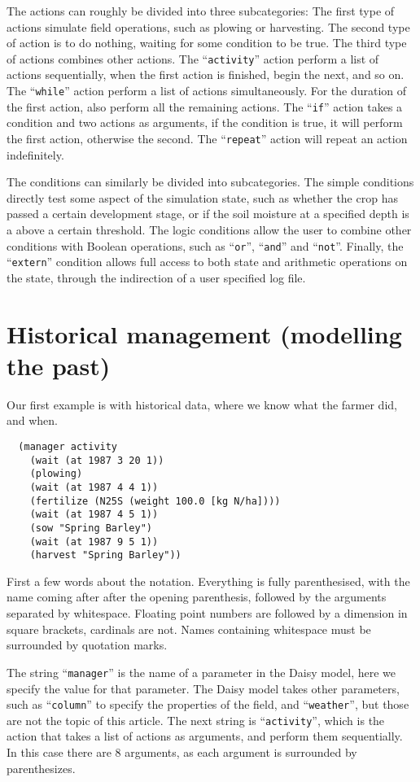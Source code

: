\documentclass[a4paper]{article}
\newcommand{\dname}[1]{``\texttt{#1}''}
\begin{document}
The actions can roughly be divided into three subcategories: The first
type of actions simulate field operations, such as plowing or
harvesting.  The second type of action is to do nothing, waiting for
some condition to be true.  The third type of actions combines other
actions.  The \dname{activity} action perform a list of actions
sequentially, when the first action is finished, begin the next, and
so on.  The \dname{while} action perform a list of actions
simultaneously.  For the duration of the first action, also perform
all the remaining actions.  The \dname{if} action takes a condition
and two actions as arguments, if the condition is true, it will
perform the first action, otherwise the second.  The \dname{repeat}
action will repeat an action indefinitely.

The conditions can similarly be divided into subcategories.  The
simple conditions directly test some aspect of the simulation state,
such as whether the crop has passed a certain development stage, or
if the soil moisture at a specified depth is a above a certain
threshold.  The logic conditions allow the user to combine other
conditions with Boolean operations, such as \dname{or}, \dname{and}
and \dname{not}.  Finally, the \dname{extern} condition allows full
access to both state and arithmetic operations on the state, through
the indirection of a user specified log file.

\section{Historical management (modelling the past)}

Our first example is with historical data, where we know what the
farmer did, and when.
\begin{verbatim}
  (manager activity
    (wait (at 1987 3 20 1))
    (plowing)
    (wait (at 1987 4 4 1))
    (fertilize (N25S (weight 100.0 [kg N/ha])))
    (wait (at 1987 4 5 1))
    (sow "Spring Barley")
    (wait (at 1987 9 5 1))
    (harvest "Spring Barley"))
\end{verbatim}

First a few words about the notation.  Everything is fully
parenthesised, with the name coming after after the opening
parenthesis, followed by the arguments separated by whitespace.
Floating point numbers are followed by a dimension in square brackets,
cardinals are not.  Names containing whitespace must be surrounded
by quotation marks.

The string \dname{manager} is the name of a parameter in the
Daisy model, here we specify the value for that parameter.  The Daisy
model takes other parameters, such as \dname{column} to specify
the properties of the field, and \dname{weather}, but those are
not the topic of this article.  The next string is
\dname{activity}, which is the action that takes a list of
actions as arguments, and perform them sequentially.  In this case
there are 8 arguments, as each argument is surrounded by
parenthesizes.
\end{document}
